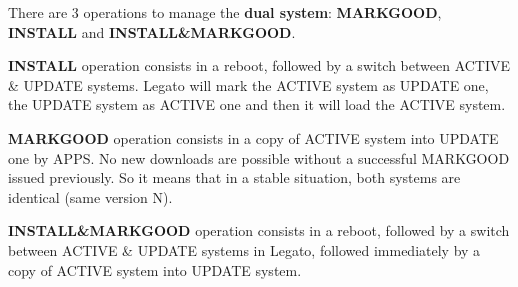 \begin{center}  \end{center} 

There are 3 operations to manage the {\bfseries dual system}\+: {\bfseries M\+A\+R\+K\+G\+O\+OD}, {\bfseries I\+N\+S\+T\+A\+LL} and {\bfseries I\+N\+S\+T\+A\+LL\&M\+A\+R\+K\+G\+O\+OD}.


\begin{DoxyItemize}
\item {\bfseries I\+N\+S\+T\+A\+LL} operation consists in a reboot, followed by a switch between A\+C\+T\+I\+VE \& U\+P\+D\+A\+TE systems. Legato will mark the A\+C\+T\+I\+VE system as U\+P\+D\+A\+TE one, the U\+P\+D\+A\+TE system as A\+C\+T\+I\+VE one and then it will load the A\+C\+T\+I\+VE system.
\end{DoxyItemize}

\begin{center}  \end{center} 


\begin{DoxyItemize}
\item {\bfseries M\+A\+R\+K\+G\+O\+OD} operation consists in a copy of A\+C\+T\+I\+VE system into U\+P\+D\+A\+TE one by A\+P\+PS. No new downloads are possible without a successful M\+A\+R\+K\+G\+O\+OD issued previously. So it means that in a stable situation, both systems are identical (same version N).
\end{DoxyItemize}

\begin{center}  \end{center} 


\begin{DoxyItemize}
\item {\bfseries I\+N\+S\+T\+A\+LL\&M\+A\+R\+K\+G\+O\+OD} operation consists in a reboot, followed by a switch between A\+C\+T\+I\+VE \& U\+P\+D\+A\+TE systems in Legato, followed immediately by a copy of A\+C\+T\+I\+VE system into U\+P\+D\+A\+TE system.
\end{DoxyItemize}

